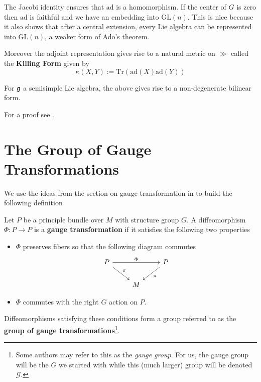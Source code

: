 		The Jacobi identity ensures that $\mathrm{ad}$ is a homomorphism. If the center of $G$ is zero then $\mathrm{ad}$ is faithful and we have an embedding into $\mathrm{GL}(n)$. This is nice because it also shows that after a central extension, every Lie algebra can be represented into $\mathrm{GL}(n)$, a weaker form of Ado's theorem.
		
		Moreover the adjoint representation gives rise to a natural metric on $\gg$ called the \textbf{Killing Form} given by
		\begin{equation}
			\kappa (X, Y) := \mathrm{Tr}(\mathrm{ad}(X) \mathrm{ad}(Y))
		\end{equation}
		
		\begin{prop}
			For $\frak g$ a semisimple Lie algebra, the above gives rise to a non-degenerate bilinear form. 
		\end{prop}
		For a proof see \cite{humphreys2012}.
		
		\section{The Group of Gauge Transformations}
		
		We use the ideas from the section on gauge transformation in \cite{lindenhovius2011} to build the following definition
		\begin{defn}
			Let $P$ be a principle bundle over $M$ with structure group $G$. A diffeomorphism $\Phi: P \to P$ is a \textbf{gauge transformation} if it satisfies the following two properties
			\begin{itemize}
				\item $\Phi$ preserves fibers so that the following diagram commutes
				\[
					\begin{tikzcd}
						P \arrow[rr,"\Phi"] \arrow[rd,"\pi"] & & P \arrow[ld,"\pi"]\\
						& M &
					\end{tikzcd}
				\]
				\item $\Phi$ commutes with the right $G$ action on $P$. 
			\end{itemize}
			Diffeomorphisms satisfying these conditions form a group referred to as the \textbf{group of gauge transformations}\footnote{Some authors may refer to this as the \emph{gauge group}. For us, the gauge group will be the $G$ we started with while this (much larger) group will be denoted $\mathcal G$.}. 
		\end{defn}
		
